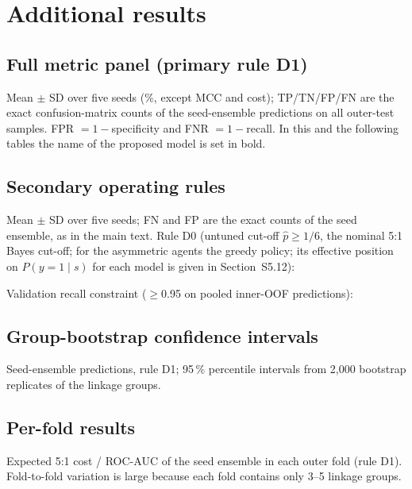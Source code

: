 \section{Additional results}
\label{sec:s-results}

\subsection{Full metric panel (primary rule D1)}
Mean $\pm$ SD over five seeds (\%, except MCC and cost); TP/TN/FP/FN are the exact confusion-matrix counts of the seed-ensemble predictions on all \nSamplesEval{} outer-test samples. FPR $=1-$specificity and FNR $=1-$recall. In this and the following tables the name of the proposed model is set in bold.

\noindent\resizebox{\textwidth}{!}{}

\subsection{Secondary operating rules}
Mean $\pm$ SD over five seeds; FN and FP are the exact counts of the seed ensemble, as in the main text. Rule D0 (untuned cut-off $\hat p\ge 1/6$, the nominal 5:1 Bayes cut-off; for the asymmetric agents the greedy policy; its effective position on $P(y=1\mid s)$ for each model is given in Section~S5.12):

\noindent\resizebox{\textwidth}{!}{}

\medskip
Validation recall constraint ($\ge$0.95 on pooled inner-OOF predictions):

\noindent\resizebox{\textwidth}{!}{}

\subsection{Group-bootstrap confidence intervals}
Seed-ensemble predictions, rule D1; 95\,\% percentile intervals from 2,000 bootstrap replicates of the \nGroupsEval{} linkage groups.

\noindent\resizebox{\textwidth}{!}{}

\subsection{Per-fold results}
Expected 5:1 cost / ROC-AUC of the seed ensemble in each outer fold (rule D1). Fold-to-fold variation is large because each fold contains only 3--5 linkage groups.

